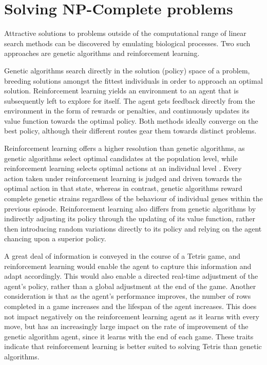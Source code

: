 \documentclass{rucsthesis}
\begin{document}
\section{Solving NP-Complete problems}

Attractive solutions to problems outside of the computational range of linear search methods can be discovered by emulating biological processes. Two such approaches are genetic algorithms and reinforcement learning. 

Genetic algorithms search directly in the solution (policy) space of a problem, breeding solutions amongst the fittest individuals in order to approach an optimal solution. Reinforcement learning yields an environment to an agent that is subsequently left to explore for itself. The agent gets feedback directly from the environment in the form of rewards or penalties, and continuously updates its value function towards the optimal policy. Both methods ideally converge on the best policy\citep{evvsrl}, although their different routes gear them towards distinct problems.

Reinforcement learning offers a higher resolution than genetic algorithms, as genetic algorithms select optimal candidates at the population level, while reinforcement learning  selects optimal actions at an individual level \citep{evvsrl}. Every action taken under reinforcement learning is judged and driven towards the optimal action in that state, whereas in contrast, genetic algorithms reward complete genetic strains regardless of the behaviour of individual genes within the previous episode. Reinforcement learning also differs from genetic algorithms by indirectly adjusting its policy through the updating of its value function, rather then introducing random variations directly to its policy and relying on the agent chancing upon a superior policy.  

A great deal of information is conveyed in the course of a Tetris game, and reinforcement learning would enable the agent to capture this information and adapt accordingly.  This would also enable a directed real-time adjustment of the agent's policy, rather than a global adjustment at the end of the game. Another consideration is that as the agent's performance improves, the number of rows completed in a game increases and the lifespan of the agent increases. This does not impact negatively on the reinforcement learning agent as it learns with every move, but has an increasingly large impact on the rate of improvement of the genetic algorithm agent, since it learns with the end of each game. These traits indicate that reinforcement learning is better suited to solving Tetris than genetic algorithms. 
\end{document}
